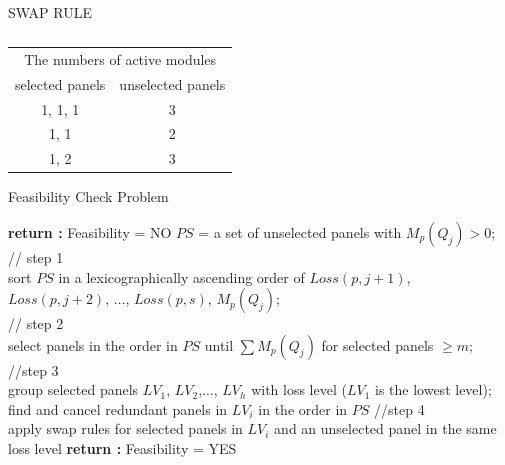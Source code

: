 \documentclass[conference]{pvsctran}
\begin{document}
\begin{table}[ht]
  \caption{}
  \centerline{SWAP RULE}
  \vskip5pt
\label{tab:swap}
\centering
\begin{tabular}{c|c}
\hline\hline
\multicolumn{2}{c}{The numbers of active modules} \\
selected panels & unselected panels \\ \hline
1, 1, 1 & 3 \\ \hline
1, 1 & 2 \\ \hline
1, 2 & 3 \\ \hline
\end{tabular}
\end{table}

\begin{algorithm}[htp]
\caption{Feasibility Check Problem}
\label{alg1}
\LinesNumbered
{}  
    {{
       {\textup{\textbf{return :}} Feasibility = NO}}
     $PS$ = a set of unselected panels with $M_{p}(Q_{j}) > 0$;\\
     // step 1\\
     sort $PS$ in a lexicographically ascending order of $Loss(p,j+1)$, $Loss(p,j+2)$, $\ldots$, $Loss(p,s)$, $M_{p}(Q_{j})$;\\
     // step 2\\
     select panels in the order in $PS$ until $\sum M_{p}(Q_{j})$ for selected panels $\geq m$;\\
     //step 3\\
     group selected panels $LV_{1}$, $LV_{2}$,$\ldots$, $LV_{h}$ with loss level ($LV_{1}$ is the lowest level);\\
     {find and cancel redundant panels in $LV_{i}$ in the order in $PS$}
     //step 4\\
     {apply swap rules for selected panels in $LV_{i}$ and an unselected panel in the same loss level}
    }
    \textup{\textbf{return :}} Feasibility = YES
\end{algorithm}
\end{document}
